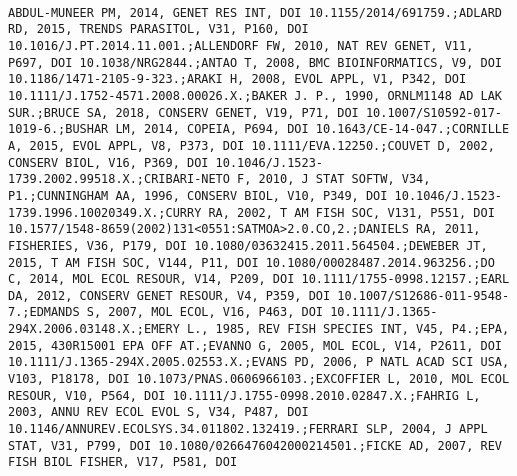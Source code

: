 \documentclass[]{article}
\begin{document}
\begin{verbatim}
                                                                                                                                                                                                                                                                                                                                                                                                                                                                                                                                                                                                                                                                                                                                                                                                                                                                                                                                                                                                                                                                                                                                                                                                                                                                                                                                                                                                                                                                                                                                          ABDUL-MUNEER PM, 2014, GENET RES INT, DOI 10.1155/2014/691759.;ADLARD RD, 2015, TRENDS PARASITOL, V31, P160, DOI 10.1016/J.PT.2014.11.001.;ALLENDORF FW, 2010, NAT REV GENET, V11, P697, DOI 10.1038/NRG2844.;ANTAO T, 2008, BMC BIOINFORMATICS, V9, DOI 10.1186/1471-2105-9-323.;ARAKI H, 2008, EVOL APPL, V1, P342, DOI 10.1111/J.1752-4571.2008.00026.X.;BAKER J. P., 1990, ORNLM1148 AD LAK SUR.;BRUCE SA, 2018, CONSERV GENET, V19, P71, DOI 10.1007/S10592-017-1019-6.;BUSHAR LM, 2014, COPEIA, P694, DOI 10.1643/CE-14-047.;CORNILLE A, 2015, EVOL APPL, V8, P373, DOI 10.1111/EVA.12250.;COUVET D, 2002, CONSERV BIOL, V16, P369, DOI 10.1046/J.1523-1739.2002.99518.X.;CRIBARI-NETO F, 2010, J STAT SOFTW, V34, P1.;CUNNINGHAM AA, 1996, CONSERV BIOL, V10, P349, DOI 10.1046/J.1523-1739.1996.10020349.X.;CURRY RA, 2002, T AM FISH SOC, V131, P551, DOI 10.1577/1548-8659(2002)131<0551:SATMOA>2.0.CO,2.;DANIELS RA, 2011, FISHERIES, V36, P179, DOI 10.1080/03632415.2011.564504.;DEWEBER JT, 2015, T AM FISH SOC, V144, P11, DOI 10.1080/00028487.2014.963256.;DO C, 2014, MOL ECOL RESOUR, V14, P209, DOI 10.1111/1755-0998.12157.;EARL DA, 2012, CONSERV GENET RESOUR, V4, P359, DOI 10.1007/S12686-011-9548-7.;EDMANDS S, 2007, MOL ECOL, V16, P463, DOI 10.1111/J.1365-294X.2006.03148.X.;EMERY L., 1985, REV FISH SPECIES INT, V45, P4.;EPA, 2015, 430R15001 EPA OFF AT.;EVANNO G, 2005, MOL ECOL, V14, P2611, DOI 10.1111/J.1365-294X.2005.02553.X.;EVANS PD, 2006, P NATL ACAD SCI USA, V103, P18178, DOI 10.1073/PNAS.0606966103.;EXCOFFIER L, 2010, MOL ECOL RESOUR, V10, P564, DOI 10.1111/J.1755-0998.2010.02847.X.;FAHRIG L, 2003, ANNU REV ECOL EVOL S, V34, P487, DOI 10.1146/ANNUREV.ECOLSYS.34.011802.132419.;FERRARI SLP, 2004, J APPL STAT, V31, P799, DOI 10.1080/0266476042000214501.;FICKE AD, 2007, REV FISH BIOL FISHER, V17, P581, DOI 
\end{verbatim}
\end{document}
